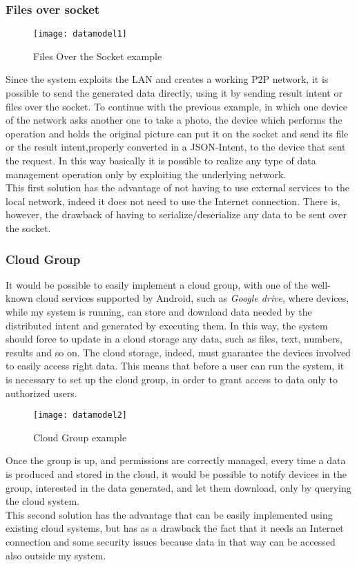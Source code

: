  \subsubsection{Files over socket}\label{fos}
 \begin{figure}[ht]
 	\centering
 	\texttt{[image: datamodel1]}
 	\caption{Files Over the Socket example}
 	\label{fig:4.5}
 \end{figure}
 Since the system exploits the LAN and creates a working P2P network, it is possible to send the generated data directly, using it by sending result intent or files over the socket. To continue with the previous example, in which one device of the network asks another one to take a photo, the device which performs the operation and holds the original picture can put it on the socket and send its file or the result intent,properly converted in a JSON-Intent, to the device that sent the request. In this way basically it is possible to realize any type of data management operation only by exploiting the underlying network.\\
 This first solution has the advantage of not having to use external services to the local network, indeed it does not need to use the Internet connection. There is, however, the drawback of having to serialize/deserialize any data to be sent over the socket.
 \subsubsection{Cloud Group}
 It would be possible to easily implement a cloud group, with one of the well-known cloud services supported by Android, such as \textit{Google drive}, where devices, while my system is running, can store and download data needed by the distributed intent and generated by executing them. In this way, the system should force to update in a cloud storage any data, such as files, text, numbers, results and so on. The cloud storage, indeed, must guarantee the devices involved to easily access right data. This means that before a user can run the system, it is necessary to set up the cloud group, in order to grant access to data only to authorized users.
   \begin{figure}[h]
 	\centering
 	\texttt{[image: datamodel2]}
 	\caption{Cloud Group example}
 	\label{fig:4.6}
 \end{figure}
  Once the group is up, and permissions are correctly managed, every time a data is produced and stored in the cloud, it would be possible to notify devices in the group, interested in the data generated, and let them download, only by querying the cloud system.\\
  This second solution has the advantage that can be easily implemented using existing cloud systems, but has as a drawback the fact that it needs an Internet connection and some security issues because data in that way can be accessed also outside my system.

